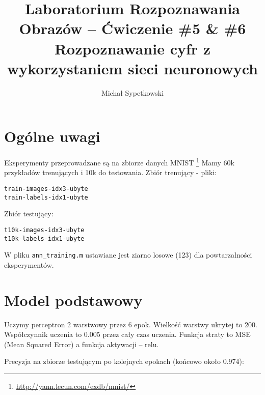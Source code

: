\documentclass[a4paper]{article}
\begin{document}
\title{ Laboratorium Rozpoznawania Obrazów – Ćwiczenie \#5 \& \#6 Rozpoznawanie cyfr z wykorzystaniem sieci neuronowych}



\author{Michał Sypetkowski}
\maketitle


\section{Ogólne uwagi}
Eksperymenty przeprowadzane są na zbiorze danych MNIST
\footnote{\url{http://yann.lecun.com/exdb/mnist/}}
Mamy 60k przykładów trenujących i 10k do testowania.
Zbiór trenujący - pliki:
\begin{verbatim}
train-images-idx3-ubyte
train-labels-idx1-ubyte
\end{verbatim}

Zbiór testujący:
\begin{verbatim}
t10k-images-idx3-ubyte
t10k-labels-idx1-ubyte
\end{verbatim}

W pliku \texttt{ann\_training.m} ustawiane jest ziarno losowe (123) dla powtarzalności eksperymentów.

\section{Model podstawowy}

Uczymy perceptron 2 warstwowy przez 6 epok.
Wielkość warstwy ukrytej to 200.
Współczynnik uczenia to 0.005 przez cały czas uczenia.
Funkcja straty to MSE (Mean Squared Error) a funkcja aktywacji -- relu.

Precyzja na zbiorze testującym po kolejnych epokach (końcowo około 0.974):

\begin{center}
\end{center}
\end{document}
